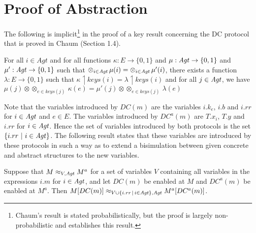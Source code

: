 \documentclass[]{llncs}
\newcommand{\xor}{\otimes}
\newcommand{\Agt}{{\it Agt}}
\begin{document}
\section{Proof of Abstraction} \label{sec:abstraction}

The following is implicit\footnote{Chaum's result is stated probabilistically, but the proof is 
largely non-probabilistic and establishes this result.} 
in the proof of a key result concerning the DC protocol that is proved in Chaum \cite{chaum} (Section 1.4).
 

\begin{lemma} \label{lem:chaum} 
For all $i\in Agt$ and for all  functions  $\kappa:E \rightarrow \{0,1\}$ and $\mu:\Agt   \rightarrow \{0,1\}$ and $\mu':\Agt   \rightarrow \{0,1\}$ 
such that $\xor_{i\in \Agt} \, \mu(i) = \xor_{i\in \Agt}\,  \mu'(i)$, there exists a function $\lambda :E \rightarrow \{0,1\}$ 
such that $\kappa \upharpoonleft keys(i) = \lambda\upharpoonleft keys(i)$ and
for all $j \in \Agt$, we have  $\mu(j)  \xor \xor_{e\in keys(j)}\,  \kappa(e) = \mu'(j) \xor \xor_{e\in keys(j)} \, \lambda(e)$
\end{lemma} 




Note that the variables introduced by $DC(m)$ are the variables $i.k_e$, $i.b$ and $i.rr$ for $i\in \Agt$ and $e\in E$.  
The variables introduced by $DC^a(m)$ are $T.x_i$, $T.y$ and $i.rr$ for $i\in \Agt$. 
Hence the set of variables introduced by both protocols is the set  $\{i.rr ~|~ i\in \Agt\}$. 
The following result states that these variables are introduced by these protocols in such a way as to extend a bisimulation
between given concrete and abstract structures to the new variables. 

\begin{theorem} \label{thm:abstractdc}
Suppose that  $M \approx_{V,\Agt} M^a$  for a set of variables $V$ containing all variables in the expressions $i.m$ for $i\in \Agt$, 
and let $DC(m)$ be enabled at $M$ and $DC^a(m)$ be enabled at $M^a$. 
Then $M[DC(m)] \approx_{V\cup \{i.rr \,|\, i\in \Agt\}, \Agt} M^a[DC^a(m)]$. 
\end{theorem} 
\end{document}
